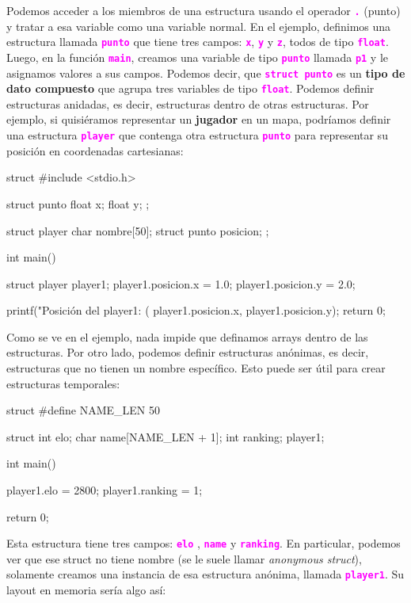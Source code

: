 \documentclass[]{scrartcl}
\newcommand{\hl}[1]{\textcolor{magenta}{\textbf{\texttt{#1}}}}
\begin{document}
Podemos acceder a los miembros de una estructura usando el operador \hl{.} (punto) y tratar a esa variable como una variable normal. En el ejemplo, definimos una estructura llamada \hl{punto} que tiene tres campos: \hl{x}, \hl{y} y \hl{z}, todos de tipo \hl{float}. Luego, en la función \hl{main}, creamos una variable de tipo \hl{punto} llamada \hl{p1} y le asignamos valores a sus campos. Podemos decir, que \hl{struct punto} es un \textbf{tipo de dato compuesto} que agrupa tres variables de tipo \hl{float}.
Podemos definir estructuras anidadas, es decir, estructuras dentro de otras estructuras. Por ejemplo, si quisiéramos representar un \textbf{jugador} en un mapa, podríamos definir una estructura \hl{player} que contenga otra estructura \hl{punto} para representar su posición en coordenadas cartesianas:
\begin{cbox}[unbreakable]{struct}
  #include <stdio.h>

  struct punto {
      float x;
      float y;
  };

  struct player {
      char nombre[50];
      struct punto posicion;
  };

  int main() {
      struct player player1;
      player1.posicion.x = 1.0;
      player1.posicion.y = 2.0;

      printf("Posición del player1: (%
              player1.posicion.x, 
              player1.posicion.y);
      return 0;
  }
\end{cbox}

Como se ve en el ejemplo, nada impide que definamos arrays dentro de las estructuras. Por otro lado, podemos definir estructuras anónimas, es decir, estructuras que no tienen un nombre específico. Esto puede ser útil para crear estructuras temporales:

\begin{cbox}[]{struct}
  #define NAME_LEN 50

  struct {
    int elo;
    char name[NAME_LEN + 1];
    int ranking;
  } player1;

  int main() {
    player1.elo = 2800;
    player1.ranking = 1;

    return 0;
  }
\end{cbox}

Esta estructura tiene tres campos: \hl{elo} , \hl{name} y \hl{ranking}. En particular, podemos ver que ese struct no tiene nombre (se le suele llamar \textit{anonymous struct}), solamente creamos una instancia de esa estructura anónima, llamada \hl{player1}. 
Su layout en memoria sería algo así:
\end{document}
